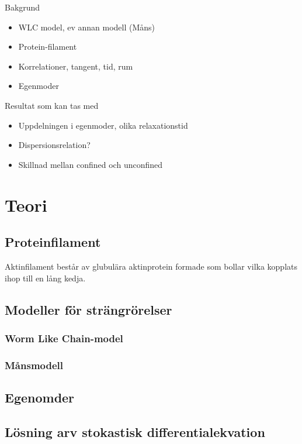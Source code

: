 
Bakgrund
\begin{itemize}
    \item WLC model, ev annan modell (Måns)
    \item Protein-filament
    \item Korrelationer, tangent, tid, rum
    \item Egenmoder
\end{itemize}

Resultat som kan tas med
\begin{itemize}
    \item Uppdelningen i egenmoder, olika relaxationstid
    \item Dispersionsrelation?
    \item Skillnad mellan confined och unconfined
    
\end{itemize}


\section{Teori}

\subsection{Proteinfilament}

Aktinfilament består av glubulära aktinprotein formade som bollar vilka kopplats ihop till en lång kedja.

\subsection{Modeller för strängrörelser}

\subsubsection{Worm Like Chain-model}

\subsubsection{Månsmodell}


\subsection{Egenomder}


\subsection{Lösning arv stokastisk differentialekvation}



